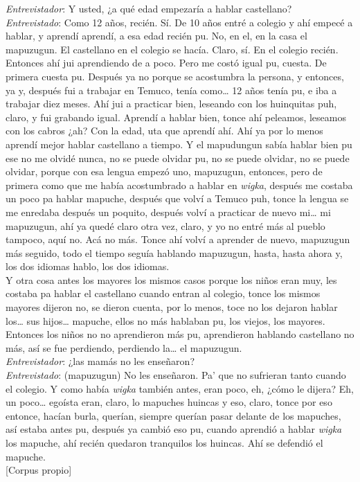 \documentclass[output=paper]{../langscibook}
\begin{document}
\ea\label{ex:olate:6}
 \emph{Entrevistador}: Y usted, ¿a qué edad empezaría a hablar castellano?\\
 \emph{Entrevistado}: Como 12 años, recién. Sí. De 10 años entré a colegio y ahí empecé a hablar, y aprendí aprendí, a esa edad recién pu. No, en el, en la casa el mapuzugun. El castellano en el colegio se hacía. Claro, sí. En el colegio recién. Entonces ahí jui aprendiendo de a poco. Pero me costó igual pu, cuesta. De primera cuesta pu. Después ya no porque se acostumbra la persona, y entonces, ya y, después fui a trabajar en Temuco, tenía como… 12 años tenía pu, e iba a trabajar diez meses. Ahí jui a practicar bien, leseando con los huinquitas puh, claro, y fui grabando igual. Aprendí a hablar bien, tonce ahí peleamos, leseamos con los cabros ¿ah? Con la edad, uta que aprendí ahí. Ahí ya por lo menos aprendí mejor hablar castellano a tiempo. Y el mapudungun sabía hablar bien pu ese no me olvidé nunca, no se puede olvidar pu, no se puede olvidar, no se puede olvidar, porque con esa lengua empezó uno, mapuzugun, entonces, pero de primera como que me había acostumbrado a hablar en \textit{wigka}, después me costaba un poco pa hablar mapuche, después que volví a Temuco puh, tonce la lengua se me enredaba después un poquito, después volví a practicar de nuevo mi… mi mapuzugun, ahí ya quedé claro otra vez, claro, y yo no entré más al pueblo tampoco, aquí no. Acá no más. Tonce ahí volví a aprender de nuevo, mapuzugun más seguido, todo el tiempo seguía hablando mapuzugun, hasta, hasta ahora y, los dos idiomas hablo, los dos idiomas.\\
 Y otra cosa antes los mayores los mismos casos porque los niños eran muy, les costaba pa hablar el castellano cuando entran al colegio, tonce los mismos mayores dijeron no, se dieron cuenta, por lo menos, toce no los dejaron hablar los… sus hijos… mapuche, ellos no más hablaban pu, los viejos, los mayores. Entonces los niños no no aprendieron más pu, aprendieron hablando castellano no más, así se fue perdiendo, perdiendo la… el mapuzugun.\\
 \emph{Entrevistador}: ¿las mamás no les enseñaron? \\
 \emph{Entrevistado}: (mapuzugun) No les enseñaron. Pa’ que no sufrieran tanto cuando el colegio. Y como había \textit{wigka} también antes, eran poco, eh, ¿cómo le dijera? Eh, un poco… egoísta eran, claro, lo mapuches huincas y eso, claro, tonce por eso entonce, hacían burla, querían, siempre querían pasar delante de los mapuches, así estaba antes pu, después ya cambió eso pu, cuando aprendió a hablar \textit{wigka} los mapuche, ahí recién quedaron tranquilos los huincas. Ahí se defendió el mapuche.  \\
 \textup{[Corpus propio]}\\
 \z
\end{document}
